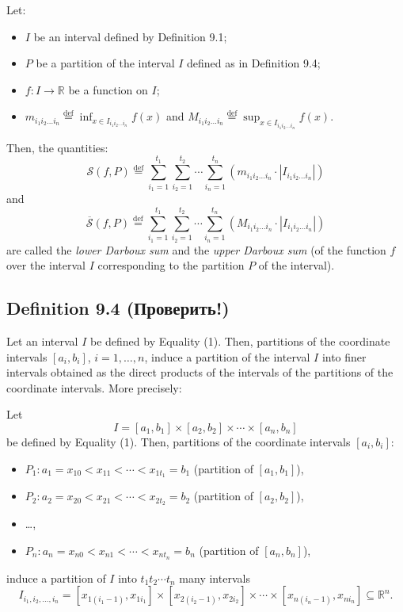 Let:
\begin{itemize}
    \item $I$ be an interval defined by Definition 9.1;
    \item $P$ be a partition of the interval $I$ defined as in Definition 9.4;
    \item $f: I \to \mathbb{R}$ be a function on $I$;
    \item $m_{i_1 i_2 \dots i_n} \overset{\text{def}}{=} \inf_{x \in I_{i_1 i_2 \dots i_n}} f(x)$ and $M_{i_1 i_2 \dots i_n} \overset{\text{def}}{=} \sup_{x \in I_{i_1 i_2 \dots i_n}} f(x)$.
\end{itemize}

Then, the quantities:
\[
    \mathcal{S}(f, P) \overset{\text{def}}{=} \sum_{i_1=1}^{t_1} \sum_{i_2=1}^{t_2} \cdots \sum_{i_n=1}^{t_n} \left( m_{i_1 i_2 \dots i_n} \cdot |I_{i_1 i_2 \dots i_n}| \right)
\]
and
\[
    \overline{\mathcal{S}}(f, P) \overset{\text{def}}{=} \sum_{i_1=1}^{t_1} \sum_{i_2=1}^{t_2} \cdots \sum_{i_n=1}^{t_n} \left( M_{i_1 i_2 \dots i_n} \cdot |I_{i_1 i_2 \dots i_n}| \right)
\]
are called the \textit{lower Darboux sum} and the \textit{upper Darboux sum} (of the function $f$ over the interval $I$ corresponding to the partition $P$ of the interval).

\subsection*{Definition 9.4 (Проверить!)}


Let an interval $I$ be defined by Equality (1).
Then, partitions of the coordinate intervals $[a_i, b_i]$, $i=1, \dots, n$, induce a partition of the interval $I$ into finer intervals obtained as the direct products of the intervals of the partitions of the coordinate intervals. More precisely:

Let
\[
    I = [a_1, b_1] \times [a_2, b_2] \times \cdots \times [a_n, b_n]
\]
be defined by Equality (1).
Then, partitions of the coordinate intervals $[a_i, b_i]$:
\begin{itemize}
    \item $P_1: a_1 = x_{10} < x_{11} < \cdots < x_{1t_1} = b_1$ \hfill (partition of $[a_1, b_1]$),
    \item $P_2: a_2 = x_{20} < x_{21} < \cdots < x_{2t_2} = b_2$ \hfill (partition of $[a_2, b_2]$),
    \item \dots,
    \item $P_n: a_n = x_{n0} < x_{n1} < \cdots < x_{nt_n} = b_n$ \hfill (partition of $[a_n, b_n]$),
\end{itemize}
induce a partition of $I$ into $t_1 t_2 \cdots t_n$ many intervals
\[
    I_{i_1, i_2, \dots, i_n} = [x_{1(i_1-1)}, x_{1i_1}] \times [x_{2(i_2-1)}, x_{2i_2}] \times \cdots \times [x_{n(i_n-1)}, x_{ni_n}] \subseteq \mathbb{R}^n.
\]

